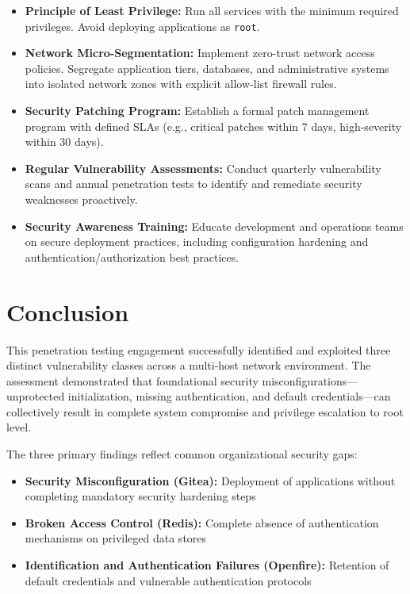 \documentclass[11pt,a4paper]{article}
\begin{document}
\begin{itemize}
    \item \textbf{Principle of Least Privilege:} Run all services with the minimum required privileges. Avoid deploying applications as \texttt{root}.
    
    \item \textbf{Network Micro-Segmentation:} Implement zero-trust network access policies. Segregate application tiers, databases, and administrative systems into isolated network zones with explicit allow-list firewall rules.
    
    \item \textbf{Security Patching Program:} Establish a formal patch management program with defined SLAs (e.g., critical patches within 7 days, high-severity within 30 days).
    
    \item \textbf{Regular Vulnerability Assessments:} Conduct quarterly vulnerability scans and annual penetration tests to identify and remediate security weaknesses proactively.
    
    \item \textbf{Security Awareness Training:} Educate development and operations teams on secure deployment practices, including configuration hardening and authentication/authorization best practices.
\end{itemize}


\section{Conclusion}

This penetration testing engagement successfully identified and exploited three distinct vulnerability classes across a multi-host network environment. The assessment demonstrated that foundational security misconfigurations—unprotected initialization, missing authentication, and default credentials—can collectively result in complete system compromise and privilege escalation to root level.

The three primary findings reflect common organizational security gaps:

\begin{itemize}
    \item \textbf{Security Misconfiguration (Gitea):} Deployment of applications without completing mandatory security hardening steps
    \item \textbf{Broken Access Control (Redis):} Complete absence of authentication mechanisms on privileged data stores
    \item \textbf{Identification and Authentication Failures (Openfire):} Retention of default credentials and vulnerable authentication protocols
\end{itemize}
\end{document}
